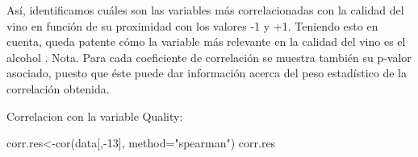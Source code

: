 \documentclass[
]{article}
\newenvironment{Shaded}{\begin{snugshade}}{\end{snugshade}}
\newcommand{\AttributeTok}[1]{\textcolor[rgb]{0.77,0.63,0.00}{#1}}
\newcommand{\DecValTok}[1]{\textcolor[rgb]{0.00,0.00,0.81}{#1}}
\newcommand{\FunctionTok}[1]{\textcolor[rgb]{0.00,0.00,0.00}{#1}}
\newcommand{\NormalTok}[1]{#1}
\newcommand{\OtherTok}[1]{\textcolor[rgb]{0.56,0.35,0.01}{#1}}
\newcommand{\SpecialCharTok}[1]{\textcolor[rgb]{0.00,0.00,0.00}{#1}}
\newcommand{\StringTok}[1]{\textcolor[rgb]{0.31,0.60,0.02}{#1}}
\begin{document}
Así, identificamos cuáles son las variables más correlacionadas con la
calidad del vino en función de su proximidad con los valores -1 y +1.
Teniendo esto en cuenta, queda patente cómo la variable más relevante en
la calidad del vino es el alcohol . Nota. Para cada coeficiente de
correlación se muestra también su p-valor asociado, puesto que éste
puede dar información acerca del peso estadístico de la correlación
obtenida.

Correlacion con la variable Quality:

\begin{Shaded}
\begin{Highlighting}[]
\NormalTok{corr.res}\OtherTok{\textless{}{-}}\FunctionTok{cor}\NormalTok{(data[,}\SpecialCharTok{{-}}\DecValTok{13}\NormalTok{], }\AttributeTok{method=}\StringTok{"spearman"}\NormalTok{)}
\NormalTok{corr.res}
\end{Highlighting}
\end{Shaded}
\end{document}
